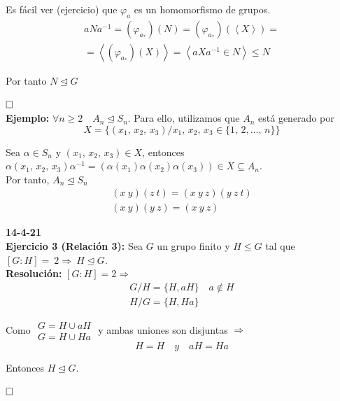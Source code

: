 \documentclass{article}
\begin{document}
Es fácil ver (ejercicio) que $\varphi_a$ es un homomorfismo de grupos.
\begin{gather*}
aNa^{-1}=(\varphi_{a_*})(N)=(\varphi_{a_*})(\left\langle X \right\rangle)=\\
=\left\langle (\varphi_{a_*})(X)\right\rangle=\left\langle aXa^{-1}\in N\right\rangle \leq N
\end{gather*}

Por tanto $N\unlhd G$

$\hfill\square$ \\

\textbf{Ejemplo:} $\forall n \geq 2 \quad A_n\unlhd S_n$. Para ello, utilizamos que $A_n$ está generado por 
\begin{equation*}
X=\{(x_1,\,x_2,\,x_3)/x_1,\,x_2,\,x_3\in\{1,\,2,\ldots,\,n\}\}
\end{equation*}

Sea $\alpha \in S_n$ y $(x_1,\,x_2,\,x_3)\in X$, entonces $\alpha(x_1,\,x_2,\,x_3)\alpha^{-1}=(\alpha(x_1)\alpha(x_2)\alpha(x_3))\in X \subseteq A_n$. \\

Por tanto, $A_n\unlhd S_n$
\begin{gather*}
(x\:y)(z\:t)=(x\:y\:z)(y\:z\:t) \\
(x\:y)(y\:z)=(x\:y\:z)
\end{gather*}

\textbf{14-4-21} \\

\textbf{Ejercicio 3 (Relación 3):} Sea $G$ un grupo finito y $H\leq G$ tal que $\left[G:H\right]=~2\Rightarrow~H\unlhd G$. \\

\textbf{Resolución:} $\left[G:H\right]=2\Rightarrow$
\begin{gather*}
G/H=\{H,aH\} \quad a\notin H\\
H/G=\{H,Ha\} 
\end{gather*}

Como $\left.\begin{array}{c}
G=H\cup aH \\
G=H\cup Ha
\end{array} \right.$ y ambas uniones son disjuntas $\Rightarrow$
\begin{equation*}
H=H\quad y \quad aH=Ha
\end{equation*}

Entonces $H\unlhd G$.

$\hfill\square$\\
\end{document}
